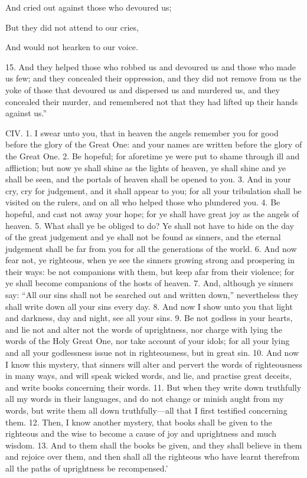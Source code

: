 And cried out against those who devoured us;

But they did not attend to our cries,

And would not hearken to our voice.

15. And they helped those who robbed us and
devoured us and those who made us few; and they
concealed their oppression, and they did not remove
from us the yoke of those that devoured us and dispersed
us and murdered us, and they concealed their
murder, and remembered not that they had lifted up
their hands against us.”


CIV. 1. I swear unto you, that in heaven the angels
remember you for good before the glory of the Great
One: and your names are written before the glory
of the Great One. 2. Be hopeful; for aforetime ye
were put to shame through ill and affliction; but now
ye shall shine as the lights of heaven, ye shall shine
and ye shall be seen, and the portals of heaven shall
be opened to you. 3. And in your cry, cry for judgement,
and it shall appear to you; for all your tribulation
shall be visited on the rulers, and on all who
helped those who plundered you. 4. Be hopeful,
and cast not away your hope; for ye shall have great
joy as the angels of heaven. 5. What shall ye be
obliged to do? Ye shall not have to hide on the day
of the great judgement and ye shall not be found as
sinners, and the eternal judgement shall be far from
you for all the generations of the world. 6. And now
fear not, ye righteous, when ye see the sinners growing
strong and prospering in their ways: be not companions
with them, but keep afar from their violence;
for ye shall become companions of the hosts of heaven.
7. And, although ye sinners say: “All our sins shall
not be searched out and written down,” nevertheless
they shall write down all your sins every day.
8. And now I show unto you that light and darkness,
day and night, see all your sins. 9. Be not godless
in your hearts, and lie not and alter not the words
of uprightness, nor charge with lying the words of the
Holy Great One, nor take account of your idols; for
all your lying and all your godlessness issue not in
righteousness, but in great sin. 10. And now I
know this mystery, that sinners will alter and pervert
the words of righteousness in many ways, and will
speak wicked words, and lie, and practise great
deceits, and write books concerning their words.
11. But when they write down truthfully all my
words in their languages, and do not change or
minish aught from my words, but write them all down
truthfully—all that I first testified concerning them.
12. Then, I know another mystery, that books shall
be given to the righteous and the wise to become a
cause of joy and uprightness and much wisdom. 13.
And to them shall the books be given, and they shall
believe in them and rejoice over them, and then shall
all the righteous who have learnt therefrom all the
paths of uprightness be recompensed.’

